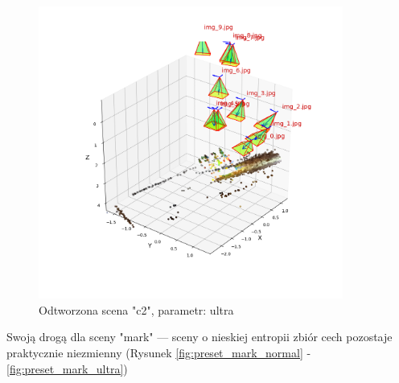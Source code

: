 \begin{figure}[h]
   \centering
   \includegraphics[width=10cm]{preset_c2/ultra.png}
   \caption{Odtworzona scena "c2", parametr: ultra}
   \label {fig:preset_c2_ultra}
\end{figure}

Swoją drogą dla sceny "mark" --- sceny o nieskiej entropii zbiór cech pozostaje praktycznie niezmienny (Rysunek \ref{fig:preset_mark_normal} - \ref{fig:preset_mark_ultra})

